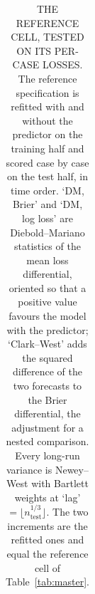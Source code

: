 \begin{table}[t]
{\begin{tabular}{lllllllll}
\bottomrule
\end{tabular}%
}
\caption{THE REFERENCE CELL, TESTED ON ITS PER-CASE LOSSES. The reference specification is refitted with and without the predictor on the training half and scored case by case on the test half, in time order. `DM, Brier' and `DM, log loss' are Diebold--Mariano statistics of the mean loss differential, oriented so that a positive value favours the model with the predictor; `Clark--West' adds the squared difference of the two forecasts to the Brier differential, the adjustment for a nested comparison. Every long-run variance is Newey--West with Bartlett weights at `lag' $= \lfloor n_{\mathrm{test}}^{1/3} \rfloor$. The two increments are the refitted ones and equal the reference cell of Table~\ref{tab:master}.}
\label{tab:cwtests}
\end{table}
